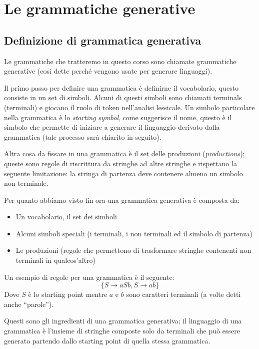 \documentclass[class=book, crop=false, oneside]{standalone}
\begin{document}
\chapter{Le grammatiche generative}

\section{Definizione di grammatica generativa}
Le grammatiche che tratteremo in questo corso sono chiamate grammatiche generative (così dette perché vengono usate per generare linguaggi).

Il primo passo per definire una grammatica è definirne il vocabolario, questo consiste in un set di simboli.
Alcuni di questi simboli sono chiamati terminals (terminali) e giocano il ruolo di token nell’analisi lessicale.
Un simbolo particolare nella grammatica è lo \emph{starting symbol}, come suggerisce il nome, questo è il simbolo che permette di iniziare a generare il linguaggio derivato dalla grammatica (tale processo sarà chiarito in seguito).

Altra cosa da fissare in una grammatica è il set delle produzioni (\emph{productions}); queste sono regole di riscrittura da stringhe ad altre stringhe e rispettano la seguente limitazione: la stringa di partenza deve contenere almeno un simbolo non-terminale.

Per quanto abbiamo visto fin ora una grammatica generativa è composta da:
	\begin{itemize}
        \item Un vocabolario, il set dei simboli
        \item Alcuni simboli speciali (i terminali, i non terminali ed il simbolo di partenza)
        \item Le produzioni (regole che permettono di trasformare stringhe contenenti non terminali in qualcos’altro)
    \end{itemize}
Un esempio di regole per una grammatica è il seguente:
\begin{equation}\label{produzioni_esempio_0}
    \{S \to aSb, S \to ab\}
\end{equation}
Dove $S$ è lo starting point mentre $a$ e $b$ sono caratteri terminali (a volte detti anche “parole”).


Questi sono gli ingredienti di una grammatica generativa; il linguaggio di una grammatica è l’insieme di stringhe composte solo da terminali che può essere generato partendo dallo starting point di quella stessa grammatica.
\end{document}
